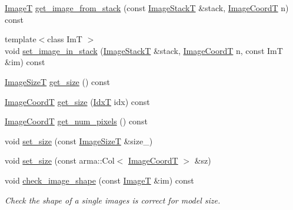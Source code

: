 \begin{DoxyCompactItemize}
\item 
\hyperlink{classmappel_1_1ImageFormat1DBase_a521a1ff391a52a636fac4aac7c7ba02c}{ImageT} \hyperlink{classmappel_1_1ImageFormat1DBase_a92d3d803a82402adcca516b53e8d5100}{get\+\_\+image\+\_\+from\+\_\+stack} (const \hyperlink{classmappel_1_1ImageFormat1DBase_a81e3246d1c5c37ebf9077b7b5bd25a76}{Image\+StackT} \&stack, \hyperlink{classmappel_1_1ImageFormat1DBase_a82ab3168eb1a87eaeb3e7c919188e9fc}{Image\+CoordT} n) const 
\item 
{\footnotesize template$<$class ImT $>$ }\\void \hyperlink{classmappel_1_1ImageFormat1DBase_a90fcfb6e39374e4372ec1cedf3c2cb91}{set\+\_\+image\+\_\+in\+\_\+stack} (\hyperlink{classmappel_1_1ImageFormat1DBase_a81e3246d1c5c37ebf9077b7b5bd25a76}{Image\+StackT} \&stack, \hyperlink{classmappel_1_1ImageFormat1DBase_a82ab3168eb1a87eaeb3e7c919188e9fc}{Image\+CoordT} n, const ImT \&im) const 
\item 
\hyperlink{classmappel_1_1ImageFormat1DBase_a6456bab2b26702022ee32ae19e90dcac}{Image\+SizeT} \hyperlink{classmappel_1_1ImageFormat1DBase_aea1194302eccc0d8ad62394176aa6b0c}{get\+\_\+size} () const 
\item 
\hyperlink{classmappel_1_1ImageFormat1DBase_a82ab3168eb1a87eaeb3e7c919188e9fc}{Image\+CoordT} \hyperlink{classmappel_1_1ImageFormat1DBase_a995bdd3b1be616d8d87af3a4a51fbad8}{get\+\_\+size} (\hyperlink{namespacemappel_ab17ec0f30b61ece292439d7ece81d3a8}{IdxT} idx) const 
\item 
\hyperlink{classmappel_1_1ImageFormat1DBase_a82ab3168eb1a87eaeb3e7c919188e9fc}{Image\+CoordT} \hyperlink{classmappel_1_1ImageFormat1DBase_a96644883bef9d230eea893ece4578e96}{get\+\_\+num\+\_\+pixels} () const 
\item 
void \hyperlink{classmappel_1_1ImageFormat1DBase_ad169407f15bd43b0cec18fa2c88725b7}{set\+\_\+size} (const \hyperlink{classmappel_1_1ImageFormat1DBase_a6456bab2b26702022ee32ae19e90dcac}{Image\+SizeT} \&size\+\_\+)
\item 
void \hyperlink{classmappel_1_1ImageFormat1DBase_ae35eebe826c2ffdb6e0b599806c88667}{set\+\_\+size} (const arma\+::\+Col$<$ \hyperlink{classmappel_1_1ImageFormat1DBase_a82ab3168eb1a87eaeb3e7c919188e9fc}{Image\+CoordT} $>$ \&sz)
\item 
void \hyperlink{classmappel_1_1ImageFormat1DBase_af308ca86f413f65e72ea7b8c890bd87a}{check\+\_\+image\+\_\+shape} (const \hyperlink{classmappel_1_1ImageFormat1DBase_a521a1ff391a52a636fac4aac7c7ba02c}{ImageT} \&im) const 
\begin{DoxyCompactList}\small\item\em Check the shape of a single images is correct for model size. \end{DoxyCompactList}\item 

\end{DoxyCompactItemize}

